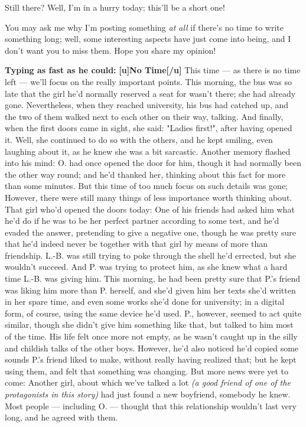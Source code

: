 Still there? Well, I'm in a hurry today; this'll be a short one!

You may ask me why I'm posting something \emph{at all} if there's no time to write something long; well, some interesting aspects have just come into being, and I don't want you to miss them. Hope you share my opinion!

\textbf{Typing as fast as he could:}
\textbf{[u]No Time[/u]}
This time --- as there is no time left --- we'll focus on the really important points. 
This morning, the bus was so late that the girl he'd normally reserved a seat for wasn't there; she had already gone. Nevertheless, when they reached university, his bus had catched up, and the two of them walked next to each other on their way, talking. And finally, when the first doors came in sight, she said: "Ladies first!", after having opened it. Well, she continued to do so with the others, and he kept smiling, even laughing about it, as he knew she was a bit sarcastic. 
Another memory flashed into his mind: O. had once opened the door for him, though it had normally been the other way round; and he'd thanked her, thinking about this fact for more than some minutes. But this time of too much focus on such details was gone; However, there were still many things of less importance worth thinking about. 
That girl who'd opened the doors today: One of his friends had asked him what he'd do if he was to be her perfect partner according to some test, and he'd evaded the answer, pretending to give a negative one, though he was pretty sure that he'd indeed never be together with that girl by means of more than friendship. 
L.-B. was still trying to poke through the shell he'd errected, but she wouldn't succeed. And P. was trying to protect him, as she knew what a hard time L.-B. was giving him. 
This morning, he had been pretty sure that P.'s friend was liking him more than P. herself, and she'd given him her texts she'd written in her spare time, and even some works she'd done for university; in a digital form, of course, using the same device he'd used. 
P., however, seemed to act quite similar, though she didn't give him something like that, but talked to him most of the time. 
His life felt once more not empty, as he wasn't caught up in the silly and childish talks of the other boys. However, he'd also noticed he'd copied some sounds P.'s friend liked to make, without really having realized that; but he kept using them, and felt that something was changing. 
But more news were yet to come: Another girl, about which we've talked a lot \emph{(a good friend of one of the protagonists in this story)} had just found a new boyfriend, somebody he knew. Most people --- including O. --- thought that this relationship wouldn't last very long, and he agreed with them. 
